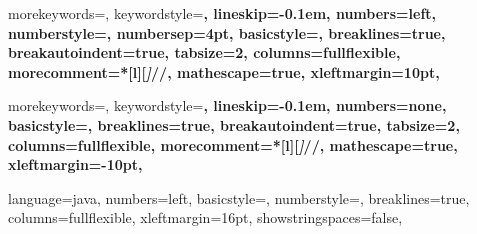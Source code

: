 
\newcommand{\jbasicstyle}{\small\sffamily} %
\newcommand{\textcode}[1]{{#1}}
\newcommand{\jnumberstyle}{\scriptsize}
\newcommand{\Hilight}{\makebox[0pt][l]{\color{gray}\rule[-3pt]{0.80\linewidth}{9pt}}}

{
  morekeywords={},
  keywordstyle=\bfseries,
  lineskip=-0.1em,
  numbers=left, %
  numberstyle=\jnumberstyle,
  numbersep=4pt,
  basicstyle=\jbasicstyle,
  breaklines=true,
  breakautoindent=true,
  tabsize=2,
  columns=fullflexible,
  morecomment=*[l][\textsl]{//},
  mathescape=true,
  xleftmargin=10pt,
}

{
  morekeywords={},
  keywordstyle=\bfseries,
  lineskip=-0.1em,
  numbers=none,
  basicstyle=\jbasicstyle,
  breaklines=true,
  breakautoindent=true,
  tabsize=2,
  columns=fullflexible,
  morecomment=*[l][\textsl]{//},
  mathescape=true,
  xleftmargin=-10pt,
}

{
  language=java,
  numbers=left,
  basicstyle=\scriptsize\ttfamily,
  numberstyle=\scriptsize,
  breaklines=true,
  columns=fullflexible,
  xleftmargin=16pt,
  showstringspaces=false,
}


